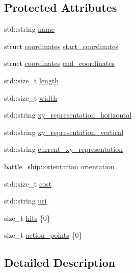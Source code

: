 \subsection*{Protected Attributes}
\begin{DoxyCompactItemize}
\item 
std\+::string \hyperlink{classbattle__ship_1_1piece_ab9a08563584021b8e162399e6761cd3f}{name}
\item 
struct \hyperlink{structbattle__ship_1_1coordinates}{coordinates} \hyperlink{classbattle__ship_1_1piece_ad870a83b17123690eea9a584e1c10fbf}{start\+\_\+coordinates}
\item 
struct \hyperlink{structbattle__ship_1_1coordinates}{coordinates} \hyperlink{classbattle__ship_1_1piece_afe29d6aca1dfa4f9f3f14f0228a6090c}{end\+\_\+coordinates}
\item 
std\+::size\+\_\+t \hyperlink{classbattle__ship_1_1piece_a005c795af8c941cea2b74f0acbeacb3c}{length}
\item 
std\+::size\+\_\+t \hyperlink{classbattle__ship_1_1piece_aa3c8683713ded6009ed0235ff480c88b}{width}
\item 
std\+::string \hyperlink{classbattle__ship_1_1piece_a3414f7d2e4058f20e547881b6e41cf70}{xy\+\_\+representation\+\_\+horizontal}
\item 
std\+::string \hyperlink{classbattle__ship_1_1piece_ac102a65c66a64259f133736c02090a3e}{xy\+\_\+representation\+\_\+vertical}
\item 
std\+::string \hyperlink{classbattle__ship_1_1piece_acc41af3747314aa607964366d12026ad}{current\+\_\+xy\+\_\+representation}
\item 
\hyperlink{namespacebattle__ship_aed87488f0a73f0d0679fe343fb61c784}{battle\+\_\+ship\+::orientation} \hyperlink{classbattle__ship_1_1piece_a026783a50d9bb6370a5ad1ace94e4476}{orientation}
\item 
std\+::size\+\_\+t \hyperlink{classbattle__ship_1_1piece_a6ee6ca91acdbacffb339001e9857e0cc}{cost}
\item 
std\+::string \hyperlink{classbattle__ship_1_1piece_a3b0c152f19a7298d2b27c596e60dd09e}{uri}
\item 
size\+\_\+t \hyperlink{classbattle__ship_1_1piece_a38c22ae1d1b48a71e025d80db345d4e0}{hits} \{0\}
\item 
size\+\_\+t \hyperlink{classbattle__ship_1_1piece_a51ee1880181f13dd0cc0a151419c4d9a}{action\+\_\+points} \{0\}
\end{DoxyCompactItemize}


\subsection{Detailed Description}


